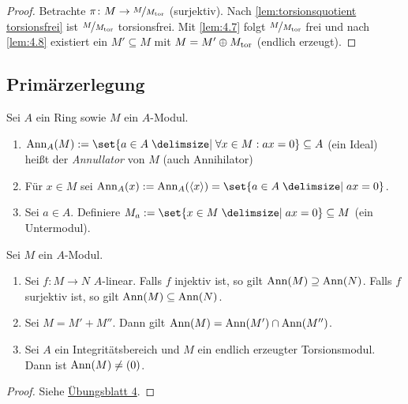 \documentclass[12pt,a4paper]{scrartcl}
\theoremstyle{cplain}
\theoremstyle{cdef}
\begin{document}
\begin{proof}
	Betrachte $\pi\colon M\to \nicefrac{M}{M_{\operatorname{tor}}}$ (surjektiv). Nach \cref{lem:torsionsquotient torsionsfrei} ist $\nicefrac{M}{M_{\operatorname{tor}}}$ torsionsfrei. Mit \cref{lem:4.7} folgt $\nicefrac{M}{M_{\operatorname{tor}}}$ frei und nach \cref{lem:4.8} existiert ein $M'\subseteq M$ mit $M = M'\oplus M_{\operatorname{tor}}$ (endlich erzeugt).
\end{proof} %

\subsection{Primärzerlegung}
\begin{defi}
	Sei $A$ ein Ring sowie $M$ ein $A$-Modul.
	\begin{enumerate}
		\item $\Ann_A(M) := \set{a\in A\given\forall x\in M: ax = 0}\subseteq A$ (ein Ideal) heißt der \emph{Annullator} von $M$ (auch Annihilator)
		\item Für $x\in M$ sei $\Ann_A(x) := \Ann_A(\<x\>) = \set{a\in A\given ax = 0}$.
		\item Sei $a\in A$. Definiere $M_a := \set{x\in M\given ax = 0}\subseteq M$ (ein Untermodul).
	\end{enumerate}
\end{defi}

\begin{lem} \label{lem:annullator}
	Sei $M$ ein $A$-Modul.
	\begin{enumerate}
		\item Sei $f\colon M\to N$ $A$-linear. Falls $f$ injektiv ist, so gilt $\operatorname{Ann}(M)\supseteq \operatorname{Ann}(N)$. Falls $f$ surjektiv ist, so gilt $\operatorname{Ann}(M)\subseteq \operatorname{Ann}(N)$.
		\item Sei $M = M'+M''$. Dann gilt $\operatorname{Ann}(M) = \operatorname{Ann}(M')\cap \operatorname{Ann}(M'')$.
		\item Sei $A$ ein Integritätsbereich und $M$ ein endlich erzeugter Torsionsmodul. Dann ist $\operatorname{Ann}(M) \neq (0)$.
	\end{enumerate}
\end{lem}
\begin{proof}
	Siehe \href{http://www.math.uni-bonn.de/ag/stroppel/Franzen_Algebra_1_Uebung/Blatt4.pdf}{Übungsblatt 4}.
\end{proof}
\end{document}
